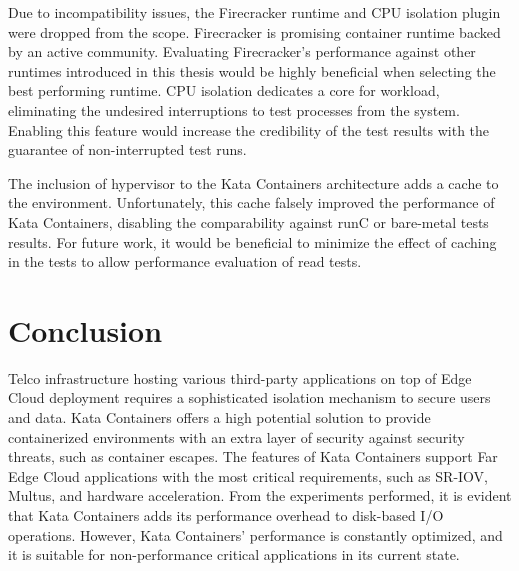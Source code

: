Due to incompatibility issues, the Firecracker runtime and CPU isolation plugin were dropped from the scope. Firecracker is promising container runtime backed by an active community. Evaluating Firecracker's performance against other runtimes introduced in this thesis would be highly beneficial when selecting the best performing runtime. CPU isolation dedicates a core for workload, eliminating the undesired interruptions to test processes from the system. Enabling this feature would increase the credibility of the test results with the guarantee of non-interrupted test runs.

The inclusion of hypervisor to the Kata Containers architecture adds a cache to the environment. Unfortunately, this cache falsely improved the performance of Kata Containers, disabling the comparability against runC or bare-metal tests results. For future work, it would be beneficial to minimize the effect of caching in the tests to allow performance evaluation of read tests.

\section{Conclusion}

Telco infrastructure hosting various third-party applications on top of Edge Cloud deployment requires a sophisticated isolation mechanism to secure users and data. Kata Containers offers a high potential solution to provide containerized environments with an extra layer of security against security threats, such as container escapes. The features of Kata Containers support Far Edge Cloud applications with the most critical requirements, such as SR-IOV, Multus, and hardware acceleration. From the experiments performed, it is evident that Kata Containers adds its performance overhead to disk-based I/O operations. However, Kata Containers' performance is constantly optimized, and it is suitable for non-performance critical applications in its current state.